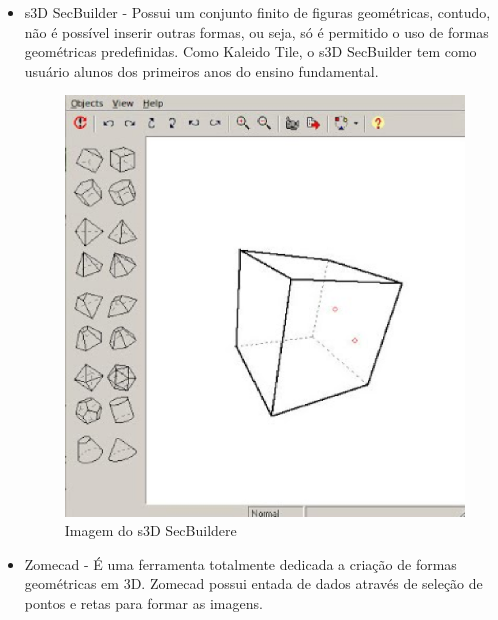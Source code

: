 \documentclass[12pt,a4paper]{article}
\begin{document}
\begin{itemize}
\begin{itemize}
		\item s3D SecBuilder - Possui um conjunto finito de figuras geométricas, contudo, não é possível inserir outras formas, ou seja, só é permitido o uso de formas geométricas predefinidas. Como Kaleido Tile, o  s3D SecBuilder tem como usuário alunos dos primeiros anos do ensino fundamental. 

		\begin{figure}[htb]
			\centering
			\includegraphics[scale=0.45]{imagens/s3.eps} 
			\caption{Imagem do s3D SecBuildere}
			\label{fig:imgSecBuildere}
		\end{figure}

		\item Zomecad - É uma ferramenta totalmente dedicada a criação de formas geométricas em 3D. Zomecad possui  entada de dados através de seleção de pontos e retas para formar as imagens.


\end{itemize}
\end{itemize}
\end{document}
